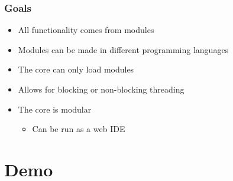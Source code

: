 \begin{frame}
  \frametitle{Goals}
  \pause
  \begin{itemize}
    \item All functionality comes from modules
    \pause
    \item Modules can be made in different programming languages
    \pause
    \item The core can only load modules
    \pause
    \item Allows for blocking or non-blocking threading
    \pause
    \item The core is modular
    \pause
    \begin{itemize}
      \item Can be run as a web IDE
    \end{itemize}
  \end{itemize}
\end{frame}

\section{Demo}
\SectionPage